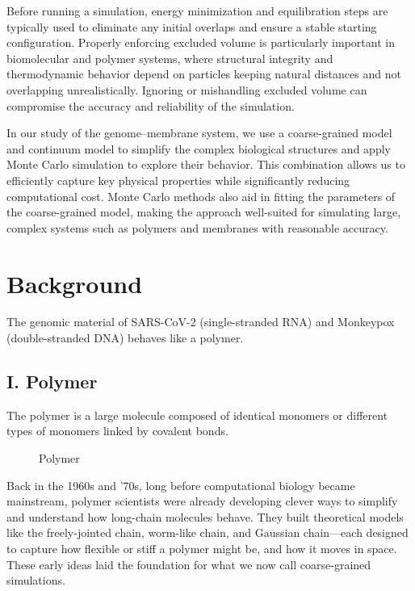 \documentclass[12pt]{article}
\begin{document}
\begin{flushleft}
Before running a simulation, energy minimization and equilibration steps are typically used to eliminate any initial overlaps and ensure a stable starting configuration. Properly enforcing excluded volume is particularly important in biomolecular and polymer systems, where structural integrity and thermodynamic behavior depend on particles keeping natural distances and not overlapping unrealistically. Ignoring or mishandling excluded volume can compromise the accuracy and reliability of the simulation.





In our study of the genome–membrane system, we use a coarse-grained model and continuum model to simplify the complex biological structures and apply Monte Carlo simulation to explore their behavior. This combination allows us to efficiently capture key physical properties while significantly reducing computational cost. Monte Carlo methods also aid in fitting the parameters of the coarse-grained model, making the approach well-suited for simulating large, complex systems such as polymers and membranes with reasonable accuracy.



\vspace{-1em} 
\section*{Background} 
The genomic material of SARS-CoV-2 (single-stranded RNA) and Monkeypox (double-stranded DNA) behaves like a polymer. 

\subsection*{I. Polymer}
The polymer is a large molecule composed of identical monomers or different types of monomers linked by covalent bonds\cite {Everaers2020}. 

\begin{figure}[!ht]
  \centering
  
  \caption{Polymer}
\end{figure}


Back in the 1960s and '70s, long before computational biology became mainstream, polymer scientists were already developing clever ways to simplify and understand how long-chain molecules behave. They built theoretical models like the freely-jointed chain, worm-like chain, and Gaussian chain—each designed to capture how flexible or stiff a polymer might be, and how it moves in space. These early ideas laid the foundation for what we now call coarse-grained simulations.


\end{flushleft}
\end{document}
